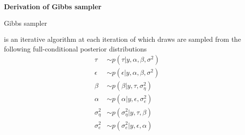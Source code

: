 \documentclass[notes,blackandwhite,mathsans,usenames,dvipsnames]{beamer}
\begin{document}
{
\begin{frame}

\begin{adjustwidth}{-0.5cm}{0cm}
\vspace{8.3cm}\Large
\textbf{{\color{mcxs2}Derivation of} {\color{mcxs1}Gibbs sampler}}
\end{adjustwidth}

\end{frame}
}

\begin{frame}{Gibbs sampler}

{\color{mcxs2}is an iterative algorithm at each iteration of which draws are sampled from the following} {\color{purple}full-conditional posterior distributions}
\begin{align*}
\tau&\sim p\left( \tau|y,\alpha,\beta,\sigma^2 \right)\\
\epsilon&\sim p\left( \epsilon|y,\alpha,\beta,\sigma^2 \right)\\
\beta&\sim p\left( \beta|y,\tau,\sigma^2_\eta \right)\\
\alpha&\sim p\left( \alpha|y,\epsilon,\sigma^2_e \right)\\
\sigma^2_\eta&\sim p\left( \sigma^2_\eta|y,\tau,\beta \right)\\
\sigma^2_e&\sim p\left( \sigma^2_e|y,\epsilon,\alpha \right)
\end{align*}

\end{frame}
\end{document}

